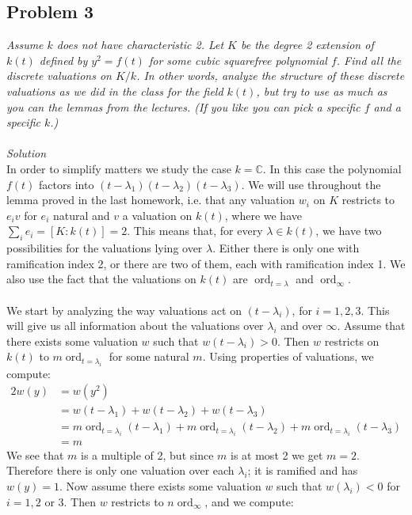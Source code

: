 \documentclass[12 pt]{article}
\newcommand{\C}{\mathbb{C}}
\DeclareMathOperator{\ord}{ord}
\begin{document}
\subsection*{Problem 3}
\emph{Assume $k$ does not have characteristic 2. Let $K$ be the degree 2 extension of $k(t)$ defined by $y^2 = f(t)$ for some cubic squarefree polynomial $f$. Find all the discrete valuations on $K/k$. In other words, analyze the structure of these discrete valuations as we did in the class for the field $k(t)$, but try to use as much as you can the lemmas from the lectures. (If you like you can pick a specific $f$ and a specific $k$.)}
\\
\\
\emph{Solution}
\\
In order to simplify matters we study the case $k = \C$. In this case the polynomial $f(t)$ factors into $(t-\lambda_1)(t-\lambda_2)(t-\lambda_3)$. We will use throughout the lemma proved in the last homework, i.e. that any valuation $w_i$ on $K$ restricts to $e_i v$ for $e_i$ natural and $v$ a valuation on $k(t)$, where we have $\sum_i e_i = [K : k(t)] = 2$. This means that, for every $\lambda \in k(t)$, we have two possibilities for the valuations lying over $\lambda$. Either there is only one with ramification index 2, or there are two of them, each with ramification index 1. We also use the fact that the valuations on $k(t)$ are $\ord_{t = \lambda}$ and $\ord_{\infty}$.
\\
\\
We start by analyzing the way valuations act on $(t - \lambda_i)$, for $i = 1,2,3$. This will give us all information about the valuations over $\lambda_i$ and over $\infty$. Assume that there exists some valuation $w$ such that $w(t-\lambda_i) > 0$. Then $w$ restricts on $k(t)$ to $m \ord_{t = \lambda_i}$ for some natural $m$. Using properties of valuations, we compute:
\begin{align*}
   2 w(y) &=  w(y^2) \\
  &= w(t - \lambda_1) + w (t - \lambda_2) + w(t - \lambda_3)     \\
 &= m\ord_{t=\lambda_i} (t - \lambda_1) + m\ord_{t=\lambda_i} (t - \lambda_2) + m\ord_{t=\lambda_i} (t - \lambda_3) \\
 &= m
\end{align*}
We see that $m$ is a multiple of 2, but since $m$ is at most 2 we get $m = 2$. Therefore there is only one valuation over each $\lambda_i$; it is ramified and has $w(y) = 1$. Now assume there exists some valuation $w$ such that $w(\lambda_i) < 0$ for $i = 1,2$ or $3$. Then $w$ restricts to $ n \ord_{\infty}$, and we compute:
\end{document}
